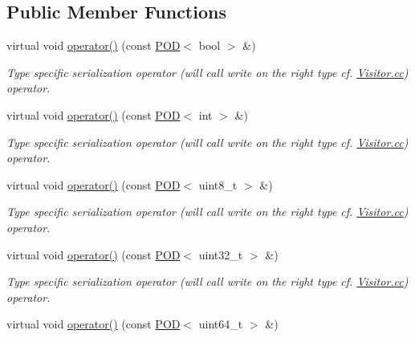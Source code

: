 \subsection*{Public Member Functions}
\begin{DoxyCompactItemize}
\item 
virtual void \hyperlink{classxtd_1_1servers_1_1param_1_1Visitor_a3f6a8a3af66864dd78e897146d6cecb5}{operator()} (const \hyperlink{classxtd_1_1servers_1_1param_1_1POD}{P\+OD}$<$ bool $>$ \&)
\begin{DoxyCompactList}\small\item\em Type specific serialization operator (will call write on the right type cf. \hyperlink{Visitor_8cc}{Visitor.\+cc}) operator. \end{DoxyCompactList}\item 
virtual void \hyperlink{classxtd_1_1servers_1_1param_1_1Visitor_a6c6f045ab7e39ae6361992e9c20b2902}{operator()} (const \hyperlink{classxtd_1_1servers_1_1param_1_1POD}{P\+OD}$<$ int $>$ \&)
\begin{DoxyCompactList}\small\item\em Type specific serialization operator (will call write on the right type cf. \hyperlink{Visitor_8cc}{Visitor.\+cc}) operator. \end{DoxyCompactList}\item 
virtual void \hyperlink{classxtd_1_1servers_1_1param_1_1Visitor_a9f900cac80adc8d63d6146335eb79e61}{operator()} (const \hyperlink{classxtd_1_1servers_1_1param_1_1POD}{P\+OD}$<$ uint8\+\_\+t $>$ \&)
\begin{DoxyCompactList}\small\item\em Type specific serialization operator (will call write on the right type cf. \hyperlink{Visitor_8cc}{Visitor.\+cc}) operator. \end{DoxyCompactList}\item 
virtual void \hyperlink{classxtd_1_1servers_1_1param_1_1Visitor_af83042cfb38b409a8c60c6dd74148b55}{operator()} (const \hyperlink{classxtd_1_1servers_1_1param_1_1POD}{P\+OD}$<$ uint32\+\_\+t $>$ \&)
\begin{DoxyCompactList}\small\item\em Type specific serialization operator (will call write on the right type cf. \hyperlink{Visitor_8cc}{Visitor.\+cc}) operator. \end{DoxyCompactList}\item 
virtual void \hyperlink{classxtd_1_1servers_1_1param_1_1Visitor_a527ddbf5eb64338a2550beb51d3db759}{operator()} (const \hyperlink{classxtd_1_1servers_1_1param_1_1POD}{P\+OD}$<$ uint64\+\_\+t $>$ \&)

\end{DoxyCompactItemize}
